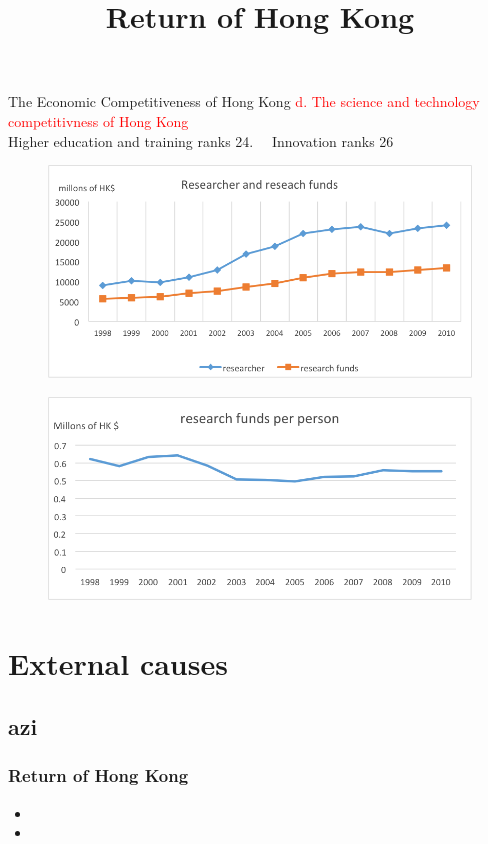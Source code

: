 \documentclass[slidestop,uncompress,mathsans, 12pt]{beamer}
\begin{document}
\begin{frame}{The Economic Competitiveness of Hong Kong}
\textcolor{red}{d. The science and technology competitivness of Hong Kong}\\
\bigskip
Higher education and training ranks 24.
~~Innovation ranks 26 \\
\begin{overprint}
\begin{figure}[h]
\centering
\includegraphics[width=1\textwidth]{hk21.png}
\label{threadsVsSync}
\end{figure}
\begin{figure}[h]
\centering
\includegraphics[width=1\textwidth]{hk22.png}
\label{threadsVsSync}
\end{figure}
\end{overprint}
\end{frame}
\section{External causes}
\subsection{azi}
\begin{frame}
\title{Return of Hong Kong}
\date{}
\titlepage
\end{frame}
\begin{frame}
\frametitle{Return of Hong Kong}
\begin{itemize}
\item<2-> 
\bigskip
\item<2-> 
\end{itemize}
\end{frame}
\end{document}
